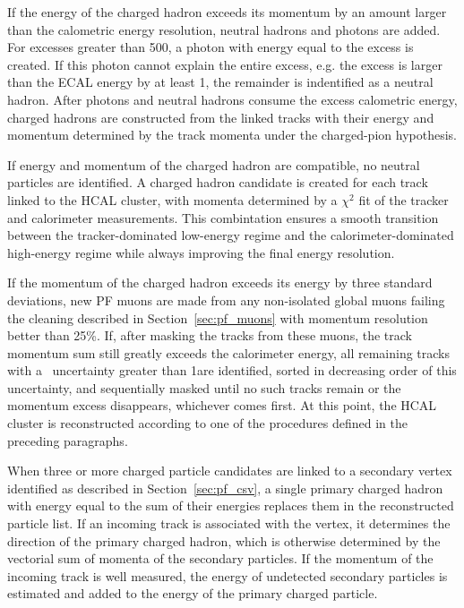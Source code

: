 If the energy of the charged hadron exceeds its momentum by an amount larger than the calometric energy resolution, neutral hadrons and photons are added. 
For excesses greater than 500\MeV, a photon with energy equal to the excess is created.
If this photon cannot explain the entire excess, e.g. the excess is larger than the ECAL energy by at least 1\GeV, the remainder is indentified as a neutral hadron. 
After photons and neutral hadrons consume the excess calometric energy, charged hadrons are constructed from the linked tracks with their energy and momentum determined by the track momenta under the charged-pion hypothesis. 

If energy and momentum of the charged hadron are compatible, no neutral particles are identified. A charged hadron candidate is created for each track linked to the HCAL cluster, with momenta determined by a $\chi^2$ fit of the tracker and calorimeter measurements.
This combintation ensures a smooth transition between the tracker-dominated low-energy regime and the calorimeter-dominated high-energy regime while always improving the final energy resolution. 

If the momentum of the charged hadron exceeds its energy by three standard deviations, new PF muons are made from any non-isolated global muons failing the cleaning described in Section~\ref{sec:pf_muons} with momentum resolution better than 25\%.
If, after masking the tracks from these muons, the track momentum sum still greatly exceeds the calorimeter energy, all remaining tracks with a \pt\ uncertainty greater than 1\GeV are identified, sorted in decreasing order of this uncertainty, and sequentially masked until no such tracks remain or the momentum excess disappears, whichever comes first. 
At this point, the HCAL cluster is reconstructed according to one of the procedures defined in the preceding paragraphs.

When three or more charged particle candidates are linked to a secondary vertex identified as described in Section~\ref{sec:pf_csv}, a single primary charged hadron with energy equal to the sum of their energies replaces them in the reconstructed particle list.
If an incoming track is associated with the vertex, it determines the direction of the primary charged hadron, which is otherwise determined by the vectorial sum of momenta of the secondary particles.
If the momentum of the incoming track is well measured, the energy of undetected secondary particles is estimated and added to the energy of the primary charged particle.

